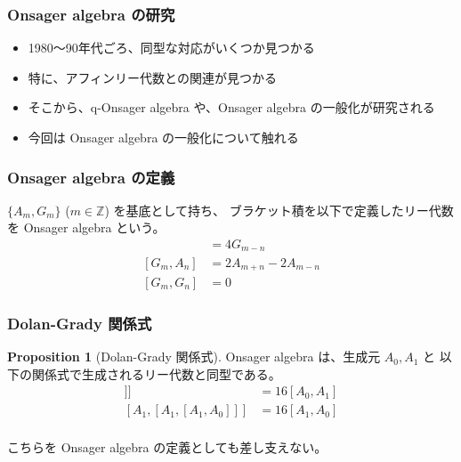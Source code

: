 \documentclass{beamer}
\theoremstyle{definition}
\newtheorem{proposition}{Proposition}
\begin{document}
\begin{frame}
    \frametitle{Onsager algebra の研究}

    \begin{itemize}
        \item 1980〜90年代ごろ、同型な対応がいくつか見つかる
        \item 特に、アフィンリー代数との関連が見つかる
        \item そこから、q-Onsager algebra や、Onsager algebra の一般化が研究される
        \item 今回は Onsager algebra の一般化について触れる
    \end{itemize}
\end{frame}

\begin{frame}
    \frametitle{Onsager algebra の定義}

    \begin{definition}
        \( \{A_m, G_m\} \) (\( m \in \mathbb{Z} \)) を基底として持ち、
        ブラケット積を以下で定義したリー代数を Onsager algebra という。
        \begin{align*}
            [A_m, A_n] & = 4G_{m-n}            \\
            [G_m, A_n] & = 2A_{m+n} - 2A_{m-n} \\
            [G_m, G_n] & = 0
        \end{align*}
    \end{definition}
\end{frame}

\begin{frame}
    \frametitle{Dolan-Grady 関係式}

    \begin{proposition}[Dolan-Grady 関係式]
        Onsager algebra は、生成元 \(A_0, A_1\) と
        以下の関係式で生成されるリー代数と同型である。
        \begin{align*}
            [A_0, [A_0, [A_0, A_1]]] & = 16[A_0, A_1] \\
            [A_1, [A_1, [A_1, A_0]]] & = 16[A_1, A_0] \\
        \end{align*}
    \end{proposition}

    こちらを Onsager algebra の定義としても差し支えない。
\end{frame}
\end{document}
